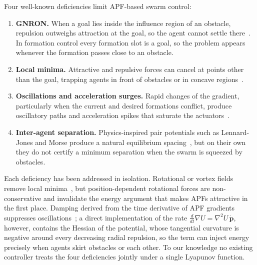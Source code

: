 \documentclass[11pt]{article}
\theoremstyle{definition}
\theoremstyle{remark}
\newcommand{\bp}{\mathbf{p}}
\begin{document}
Four well-known deficiencies limit APF-based swarm control:
\begin{enumerate}[label=(D\arabic*),leftmargin=*]
  \item \textbf{GNRON.} When a goal lies inside the influence region of an
    obstacle, repulsion outweighs attraction at the goal, so the agent cannot
    settle there~\cite{ge2000}. In formation control every formation slot is a
    goal, so the problem appears whenever the formation passes close to an
    obstacle.
  \item \textbf{Local minima.} Attractive and repulsive forces can cancel at
    points other than the goal, trapping agents in front of obstacles or in
    concave regions~\cite{koren1991}.
  \item \textbf{Oscillations and acceleration surges.} Rapid changes of the
    gradient, particularly when the current and desired formations conflict,
    produce oscillatory paths and acceleration spikes that saturate the
    actuators~\cite{han2025time}.
  \item \textbf{Inter-agent separation.} Physics-inspired pair potentials such
    as Lennard-Jones and Morse produce a natural equilibrium spacing~\cite{xu2025consensus},
    but on their own they do not certify a minimum separation when the swarm
    is squeezed by obstacles.
\end{enumerate}
Each deficiency has been addressed in isolation. Rotational or vortex fields
remove local minima~\cite{hou2026irapf,manteaux2024rapf}, but position-dependent
rotational forces are non-conservative and invalidate the energy argument that
makes APFs attractive in the first place. Damping derived from the time
derivative of APF gradients suppresses oscillations~\cite{li2024lowosc,han2025time};
a direct implementation of the rate $\tfrac{d}{dt}\nabla U = \nabla^2 U\,\dot{\bp}$,
however, contains the Hessian of the potential, whose tangential curvature is
negative around every decreasing radial repulsion, so the term can inject
energy precisely when agents skirt obstacles or each other. To our knowledge no
existing controller treats the four deficiencies jointly under a single
Lyapunov function.
\end{document}
